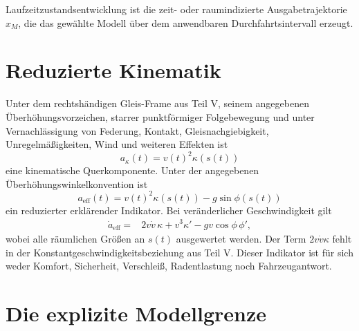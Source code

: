 \begin{definition}[Laufzeitzustandsentwicklung]
\label{def:runtime-dynamics-state-evolution}
Laufzeitzustandsentwicklung ist die zeit- oder raumindizierte
Ausgabetrajektorie \(x_M\), die das gewählte Modell über dem anwendbaren
Durchfahrtsintervall erzeugt.
\end{definition}

\section{Reduzierte Kinematik}

Unter dem rechtshändigen Gleis-Frame aus Teil V, seinem angegebenen
Überhöhungsvorzeichen, starrer punktförmiger Folgebewegung und unter
Vernachlässigung von Federung, Kontakt, Gleisnachgiebigkeit, Unregelmäßigkeiten,
Wind und weiteren Effekten ist
\[
a_\kappa(t)=v(t)^2\kappa(s(t))
\]
eine kinematische Querkomponente. Unter der angegebenen
Überhöhungswinkelkonvention ist
\[
a_{\mathrm{eff}}(t)
=v(t)^2\kappa(s(t))-g\sin\phi(s(t))
\]
ein reduzierter erklärender Indikator. Bei veränderlicher Geschwindigkeit gilt
\begin{align}
\dot a_{\mathrm{eff}}
={}&2v\dot v\,\kappa
  +v^3\kappa'
  -gv\cos\phi\,\phi',
\label{eq:variable-speed-effective-rate}
\end{align}
wobei alle räumlichen Größen an \(s(t)\) ausgewertet werden. Der Term
\(2v\dot v\kappa\) fehlt in der Konstantgeschwindigkeitsbeziehung aus Teil V.
Dieser Indikator ist für sich weder Komfort, Sicherheit, Verschleiß,
Radentlastung noch Fahrzeugantwort.

\section{Die explizite Modellgrenze}

\begin{center}
\end{center}

